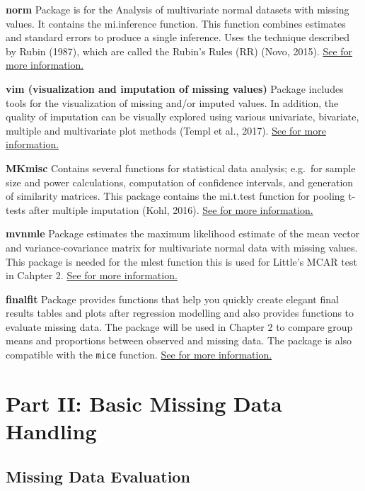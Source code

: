 \documentclass[
]{book}
\begin{document}
\textbf{norm}
Package is for the Analysis of multivariate normal datasets with missing values. It contains the mi.inference function. This function combines estimates and standard errors to produce a single inference. Uses the technique described by Rubin (1987), which are called the Rubin's Rules (RR) (Novo, 2015).
\href{https://cran.r-project.org/web/packages/norm/index.html}{See for more information.}

\textbf{vim (visualization and imputation of missing values)}
Package includes tools for the visualization of missing and/or imputed values. In addition, the quality of imputation can be visually explored using various univariate, bivariate, multiple and multivariate plot methods (Templ et al., 2017).
\href{https://cran.r-project.org/web/packages/mi/index.html}{See for more information.}

\textbf{MKmisc}
Contains several functions for statistical data analysis; e.g.~for sample size and power calculations, computation of confidence intervals, and generation of similarity matrices. This package contains the mi.t.test function for pooling t-tests after multiple imputation (Kohl, 2016).
\href{https://cran.r-project.org/web/packages/MKmisc/index.html}{See for more information.}

\textbf{mvnmle}
Package estimates the maximum likelihood estimate of the mean vector and variance-covariance matrix for multivariate normal data with missing values. This package is needed for the mlest function this is used for Little's MCAR test in Cahpter 2.
\href{https://cran.r-project.org/web/packages/mvnmle/index.html}{See for more information.}

\textbf{finalfit}
Package provides functions that help you quickly create elegant final results tables and plots after regression modelling and also provides functions to evaluate missing data. The package will be used in Chapter 2 to compare group means and proportions between observed and missing data. The package is also compatible with the \texttt{mice} function.
\href{https://finalfit.org/index.html}{See for more information.}

\hypertarget{part-part-ii-basic-missing-data-handling}{%
\part{Part II: Basic Missing Data Handling}\label{part-part-ii-basic-missing-data-handling}}

\hypertarget{missing-data-evaluation}{%
\chapter{Missing Data Evaluation}\label{missing-data-evaluation}}
\end{document}
